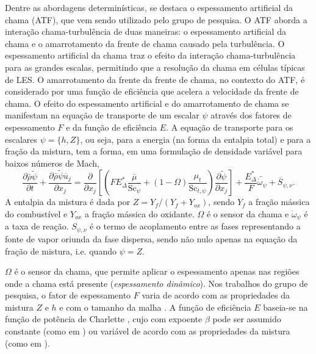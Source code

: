 Dentre as abordagens determinísticas, se destaca o espessamento artificial da chama (ATF), que vem sendo utilizado pelo grupo de pesquisa.
O ATF aborda a interação chama-turbulência de duas maneiras: o espessamento artificial da chama e o amarrotamento da frente de chama causado pela turbulência.
O espessamento artificial da chama traz o efeito da interação chama-turbulência para as grandes escalas, permitindo que a resolução da chama em células típicas de LES.
O amarrotamento da frente da frente de chama, no contexto do ATF, é considerado por uma função de eficiência que acelera a velocidade da frente de chama.
O efeito do espessamento artificial e do amarrotamento de chama se manifestam na equação de transporte de um escalar $\psi$ através dos fatores de espessamento $F$ e da função de eficiência $E$.
A equação de transporte para os escalares  $\psi=\lbrace h, Z\rbrace$, ou seja, para a energia (na forma da entalpia total) e para a fração da mistura, tem a forma, em uma formulação de densidade variável para baixos números de Mach,
\begin{equation}
    \frac{\partial \bar \rho \widetilde \psi}{\partial t} + 
    \frac{\partial \bar \rho \widetilde \psi \overline u_j}{\partial x_j} =
    \frac{\partial }{\partial x_j} \left[ \left(
    FE^*_\Delta \frac{\bar\mu}{\text{Sc}_\psi} + (1-\Omega)\frac{\mu_t}{\text{Sc}_{t,\psi}}
    \right) \frac{\partial \widetilde \psi}{\partial x_j}
    \right] +
    \frac{E^*_\Delta}{F}\widetilde{\dot{\omega}_\psi} + 
    \overline S_{\psi,\nu}.
    \label{eq:FGM}
\end{equation}
A entalpia da mistura é dada por $Z=Y_f/{(Y_f+Y_{ox})}$, sendo $Y_f$ a fração mássica do combustível e $Y_{ox}$ a fração mássica do oxidante.
$\Omega$ é o sensor da chama e $\dot \omega_\psi$ é a taxa de reação. 
$S_{\psi,\nu}$ é o termo de acoplamento entre as fases representando a fonte de vapor oriunda da fase dispersa, sendo não nulo apenas na equação da fração de mistura, i.e. quando $\psi=Z$.

$\Omega$ é o sensor da chama, que permite aplicar o espessamento apenas nas regiões onde a chama está presente (\emph{espessamento dinâmico}).
Nos trabalhos do grupo de pesquisa, o fator de espessamento $F$ varia de acordo com as propriedades da mistura $Z$ e $h$ e com o tamanho da malha \cite{SacomanoF2017PhD,SacomanoF2017CF}.
A função de eficiência $E$ baseia-se na função de potência de Charlette \cite{CharletteF2002}, cujo com expoente $\beta$ pode ser assumido constante (como em \cite{SacomanoF2017PhD,SacomanoF2017CF,SacomanoF2019IJHMT,ShastryV2023,SekularacN2024}) ou variável de acordo com as propriedades da mistura (como em \cite{SacomanoF2020CF}).

